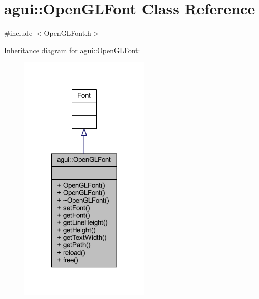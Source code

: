 \hypertarget{classagui_1_1_open_g_l_font}{}\section{agui\+:\+:Open\+G\+L\+Font Class Reference}
\label{classagui_1_1_open_g_l_font}


{\ttfamily \#include $<$Open\+G\+L\+Font.\+h$>$}



Inheritance diagram for agui\+:\+:Open\+G\+L\+Font\+:\nopagebreak
\begin{figure}[H]
\begin{center}
\leavevmode
\includegraphics[width=176pt]{classagui_1_1_open_g_l_font__inherit__graph}
\end{center}
\end{figure}


